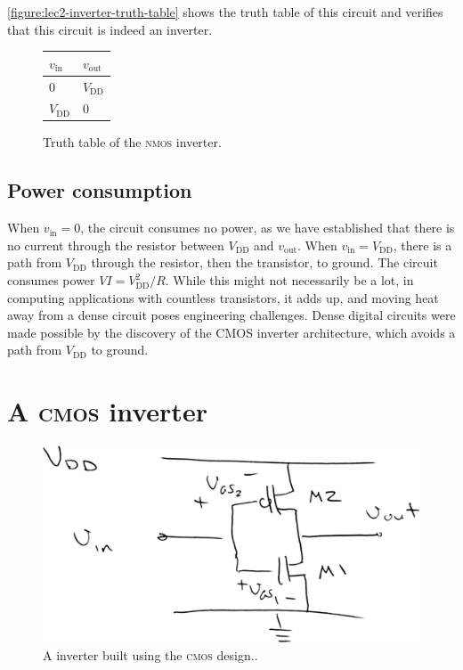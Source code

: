 \autoref{figure:lec2-inverter-truth-table} shows
the truth table of this circuit and verifies that this circuit is indeed
an inverter.

\begin{figure}
  \centering
  \begin{tabular}{ll}
    \(v_\text{in}\) & \(v_\text{out}\) \\\hline
    0 & \(V_\text{DD}\)\\
    \(V_\text{DD}\) & 0
  \end{tabular}
  \caption{Truth table of the \textsc{nmos} inverter.}
  \label{figure:lec2-inverter-truth-table}
\end{figure}

\subsection{Power consumption}
When \(v_\text{in} = 0\), the circuit consumes no power, as we have established that there is no current through the resistor between \(V_\text{DD}\) and \(v_\text{out}\).
When \(v_\text{in} = V_\text{DD}\), there is a path from \(V_\text{DD}\) through the resistor, then the transistor, to ground.
The circuit consumes power \(VI = {V_\text{DD}^2}/{R}\).
While this might not necessarily be a lot, in computing applications with countless transistors, it adds up, and moving heat away from a dense circuit poses engineering challenges.
Dense digital circuits were made possible by the discovery of the CMOS inverter architecture, which avoids a path from \(V_\text{DD}\) to ground.

\section{A \textsc{cmos} inverter}
\begin{figure}
  \centering
  \includegraphics[width=0.75\linewidth]{figures/CMOS-inverter}
  \caption{A inverter built using the \textsc{cmos} design..}
  \label{figure:lec2-CMOS-inverter}
\end{figure}

